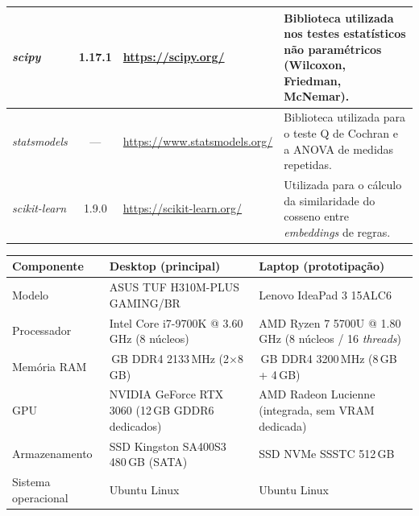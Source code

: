 \begin{tabframed}[!htb]
\begin{tabular}{|p{2.7cm}|c|>{\raggedright\arraybackslash}p{3.5cm}|>{\raggedright\arraybackslash}p{6cm}|}
		\emph{scipy} & 1.17.1 & \url{https://scipy.org/} &
		Biblioteca utilizada nos testes estatísticos não paramétricos (Wilcoxon, Friedman, McNemar). \\
		\hline
		
		\emph{statsmodels} & --- & \url{https://www.statsmodels.org/} &
		Biblioteca utilizada para o teste Q de Cochran e a ANOVA de medidas repetidas. \\
		\hline
		
		\emph{scikit-learn} & 1.9.0 & \url{https://scikit-learn.org/} &
		Utilizada para o cálculo da similaridade do cosseno entre \emph{embeddings} de regras. \\
		\hline
		
	\end{tabular}
	\fonte{}
\end{tabframed}

\begin{tabframed}[!htb]
	\centering
	\caption{\emph{Hardware} utilizado no desenvolvimento do trabalho.\label{quad:hardware}}
	\footnotesize
	\begin{tabular}{|p{3cm}|>{\raggedright\arraybackslash}p{5.5cm}|>{\raggedright\arraybackslash}p{5.5cm}|}
		\hline
		\textbf{Componente} & \textbf{Desktop (principal)} & \textbf{Laptop (prototipação)} \\
		\hline
		
		Modelo &
		ASUS TUF H310M-PLUS GAMING/BR &
		Lenovo IdeaPad 3 15ALC6 \\
		\hline
		
		Processador &
		Intel Core i7-9700K @ 3.60\,GHz (8 núcleos) &
		AMD Ryzen 7 5700U @ 1.80\,GHz (8 núcleos / 16 \emph{threads}) \\
		\hline
		
		Memória RAM &
		16\,GB DDR4 2133\,MHz (2$\times$8\,GB) &
		12\,GB DDR4 3200\,MHz (8\,GB + 4\,GB) \\
		\hline
		
		GPU &
		NVIDIA GeForce RTX 3060 (12\,GB GDDR6 dedicados) &
		AMD Radeon Lucienne (integrada, sem VRAM dedicada) \\
		\hline
		
		Armazenamento &
		SSD Kingston SA400S3 480\,GB (SATA) &
		SSD NVMe SSSTC 512\,GB \\
		\hline
		
		Sistema operacional &
		Ubuntu Linux &
		Ubuntu Linux \\
		\hline
		
	\end{tabular}
	\fonte{}
\end{tabframed}

